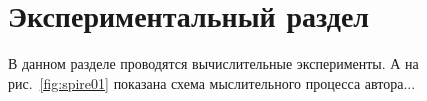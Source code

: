 \chapter{Экспериментальный раздел}
\label{cha:research}

В данном разделе проводятся вычислительные эксперименты.
А на рис.~\ref{fig:spire01} показана схема мыслительного процесса автора...



